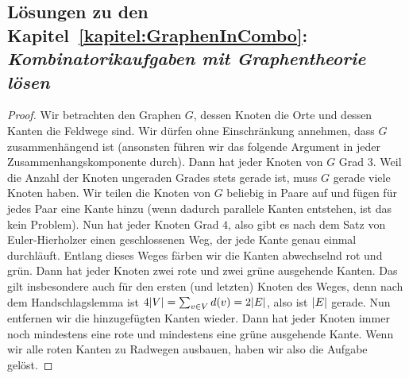 
\subsection*{Lösungen zu den Kapitel~\ref{kapitel:GraphenInCombo}: \emph{Kombinatorikaufgaben mit Graphentheorie lösen}}

\begin{proof}
	Wir betrachten den Graphen $G$, dessen Knoten die Orte und dessen Kanten die Feldwege sind. Wir dürfen ohne Einschränkung annehmen, dass $G$ zusammenhängend ist (ansonsten führen wir das folgende Argument in jeder Zusammenhangskomponente durch). Dann hat jeder Knoten von $G$ Grad $3$. Weil die Anzahl der Knoten ungeraden Grades stets gerade ist, muss $G$ gerade viele Knoten haben. Wir teilen die Knoten von $G$ beliebig in Paare auf und fügen für jedes Paar eine Kante hinzu (wenn dadurch parallele Kanten entstehen, ist das kein Problem). Nun hat jeder Knoten Grad $4$, also gibt es nach dem Satz von Euler-Hierholzer einen geschlossenen Weg, der jede Kante genau einmal durchläuft. Entlang dieses Weges färben wir die Kanten abwechselnd rot und grün. Dann hat jeder Knoten zwei rote und zwei grüne ausgehende Kanten. Das gilt insbesondere auch für den ersten (und letzten) Knoten des Weges, denn nach dem Handschlagslemma ist $4\lvert V\rvert=\sum_{v\in V}d(v)=2\lvert E\rvert$, also ist $\lvert E\rvert$ gerade. Nun entfernen wir die hinzugefügten Kanten wieder. Dann hat jeder Knoten immer noch mindestens eine rote und mindestens eine grüne ausgehende Kante. Wenn wir alle roten Kanten zu Radwegen ausbauen, haben wir also die Aufgabe gelöst.
\end{proof}

